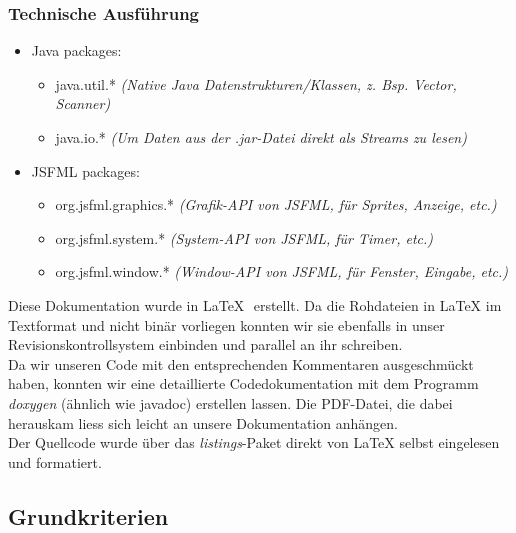 \documentclass[12pt,a4paper]{scrartcl}
\begin{document}
\subsubsection{Technische Ausführung}
\begin{itemize}
\item Java packages: \begin{itemize}
	\item java.util.* \textit{(Native Java Datenstrukturen/Klassen, z. Bsp. Vector, Scanner)}
	\item java.io.* \textit{(Um Daten aus der .jar-Datei direkt als Streams zu lesen)}
\end{itemize}
\item JSFML packages: \begin{itemize}
	\item org.jsfml.graphics.* \textit{(Grafik-API von JSFML, für Sprites, Anzeige, etc.)}
	\item org.jsfml.system.* \textit{(System-API von JSFML, für Timer, etc.)}
	\item org.jsfml.window.* \textit{(Window-API von JSFML, für Fenster, Eingabe, etc.)}
\end{itemize}
\end{itemize}

Diese Dokumentation wurde in \LaTeX \,\, erstellt. Da die Rohdateien in LaTeX im Textformat und nicht
binär vorliegen konnten wir sie ebenfalls in unser Revisionskontrollsystem einbinden und parallel
an ihr schreiben.\\

Da wir unseren Code mit den entsprechenden Kommentaren ausgeschmückt haben,
konnten wir eine detaillierte Codedokumentation mit dem Programm \textit{doxygen} (ähnlich wie javadoc) erstellen lassen.
Die PDF-Datei, die dabei herauskam liess sich leicht an unsere Dokumentation anhängen.\\

Der Quellcode wurde über das \textit{listings}-Paket direkt von LaTeX selbst eingelesen und formatiert.

\subsection{Grundkriterien}
\end{document}
